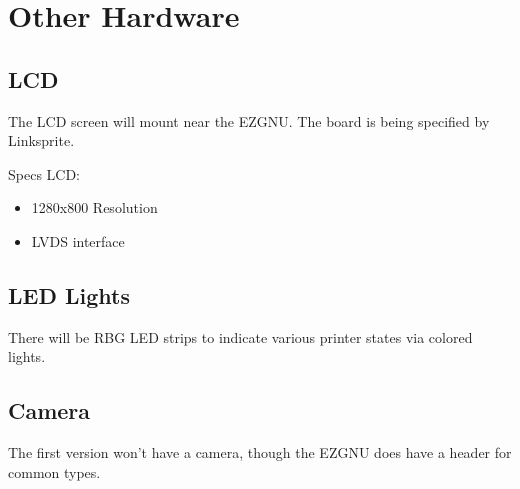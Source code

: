 

\section{Other Hardware}

\subsection{LCD}
The LCD screen will mount near the EZGNU. The board is being specified by
Linksprite.

Specs LCD:

\begin{itemize}
  \item{1280x800 Resolution}
  \item{LVDS interface}
\end{itemize}


\subsection{LED Lights}
There will be RBG LED strips to indicate various printer states via colored
lights.

\subsection{Camera}
The first version won't have a camera, though the EZGNU does have a header for
common types.

